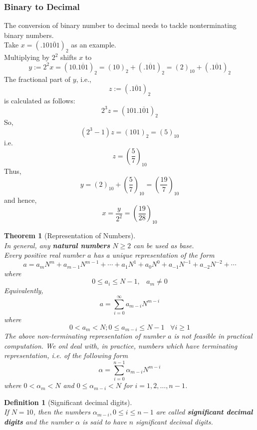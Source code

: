 \documentclass[12pt]{article}
\newtheorem{definition}{Definition}[section]
\newtheorem{theorem}{Theorem}[section]
\theoremstyle{definition}
\begin{document}
\subsubsection{Binary to Decimal}
The conversion of binary number to decimal needs to tackle nonterminating binary numbers.\\
Take $x=(.10\overline{101})_2$ as an example.\\
Multiplying by $2^2$ shifts $x$ to
\[
y:=2^2 x = (10.\overline{101})_2 = (10)_2+(.\overline{101})_2 = (2)_{10}+(.\overline{101})_2
\]
The fractional part of $y$, i.e.,
\[
z:=(.\overline{101})_2
\]
is calculated as follows:
\[
2^3z = (101.\overline{101})_2
\]
So,
\[
(2^3-1)z= (101)_2 = (5)_{10}
\]
i.e.
\[
z = \left(\frac{5}{7}\right)_{10}
\]
Thus, 
\[
y=(2)_{10}+\left(\frac{5}{7}\right)_{10}=\left(\frac{19}{7}\right)_{10}
\]
and hence,
\[
x=\frac{y}{2^2}=\left(\frac{19}{28}\right)_{10}
\]
\begin{theorem}[Representation of Numbers]
\hfill\\\normalfont In general, any \textbf{natural numbers} $N\geq 2$ can be used as base.\\
Every positive real number $a$ has a unique representation of the form
\[
a=a_mN^m+a_{m-1}N^{m-1}+\cdots+a_1N^1+a_0N^0+a_{-1}N^{-1}+a_{-2}N^{-2}+\cdots
\]
where
\[
0\leq a_i\leq N-1,\;\;\;a_m\neq 0
\]
Equivalently,
\[
a=\sum_{i=0}^\infty a_{m-i}N^{m-i}
\]
where
\[
0<a_m<N; 0\leq a_{m-i}\leq N - 1\;\;\; \forall i\geq 1
\]
The above non-terminating representation of number $a$ is not feasible in practical computation. We onl deal with, in practice, numbers which have \textit{terminating} representation, i.e. of the following form
\[
\alpha = \sum_{i = 0}^{n-1}\alpha_{m-i}N^{m-i}
\]
where $0<\alpha_m<N$ and $0\leq \alpha_{m-i}<N$ for $i = 1,2,\ldots, n-1$.
\end{theorem}
\begin{definition}[Significant decimal digits]
\hfill\\\normalfont If $N = 10$, then the numbers $\alpha_{m-i}, 0\leq i \leq n-1$ are called \textbf{significant decimal digits} and the number $\alpha$ is said to have $n$ significant decimal digits.
\end{definition}
\end{document}
